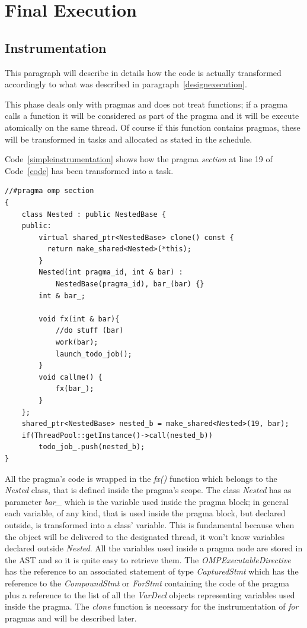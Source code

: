 \documentclass[a4paper,11pt,oneside]{book}
\begin{document}
\section{Final Execution}
\subsection{Instrumentation}
This paragraph will describe in details how the code is actually transformed accordingly to what was described in paragraph~\ref{designexecution}.

This phase deals only with pragmas and does not treat functions; if a pragma calls a function it will be considered as part of the pragma and it will be execute atomically on the same thread. Of course if this function contains pragmas, these will be transformed in tasks and allocated as stated in the schedule.

Code~\ref{simpleinstrumentation} shows how the pragma \emph{section} at line 19 of Code~\ref{code} has been transformed into a task.

\begin{lstlisting}[language=CCC, caption=Example of an instrumented \emph{section} pragma from Code~\ref{code}., label=simpleinstrumentation]
 //#pragma omp section
{
    class Nested : public NestedBase {
    public: 
        virtual shared_ptr<NestedBase> clone() const { 
          return make_shared<Nested>(*this); 
        } 
        Nested(int pragma_id, int & bar) : 
            NestedBase(pragma_id), bar_(bar) {}
        int & bar_;
            
        void fx(int & bar){   
            //do stuff (bar)
            work(bar);
            launch_todo_job(); 
        }
        void callme() {
            fx(bar_);
        }
    };
    shared_ptr<NestedBase> nested_b = make_shared<Nested>(19, bar);                             
    if(ThreadPool::getInstance()->call(nested_b)) 
        todo_job_.push(nested_b); 
}
\end{lstlisting}

All the pragma’s code is wrapped in the \emph{fx()} function which belongs to the \emph{Nested} class, that is defined inside the pragma’s scope. The class \emph{Nested} has as parameter \emph{bar\_} which is the variable used inside the pragma block; in general each variable, of any kind, that is used inside the pragma block, but declared outside, is transformed into a class’ variable. This is fundamental because when the object will be delivered to the designated thread, it won’t know variables declared outside \emph{Nested}. All the variables used inside a pragma node are stored in the AST and so it is quite easy to retrieve them. The \emph{OMPExecutableDirective} has the reference to an associated statement of type \emph{CapturedStmt} which has the reference to the \emph{CompoundStmt} or \emph{ForStmt} containing the code of the pragma plus a reference to the list of all the \emph{VarDecl} objects representing variables used inside the pragma. The \emph{clone} function is necessary for the instrumentation of \emph{for} pragmas and will be described later.
\end{document}
